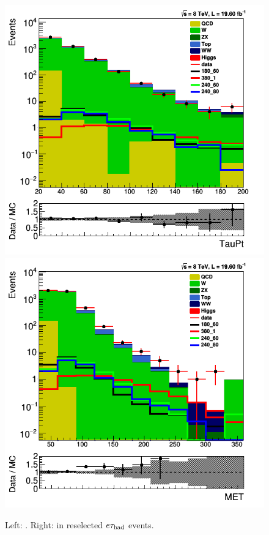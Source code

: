 \begin{figure}[!Hhtb]
\centering
\includegraphics[angle=0,scale=0.35]{SelectionEleTau/TauPt.png}
\includegraphics[angle=0,scale=0.35]{SelectionEleTau/MET.png}
\caption{Left: \Tau\PT. Right: \MET in reselected $e\tau_{\rm had}$ events.}
\label{fig:datamceletau}
\end{figure}

